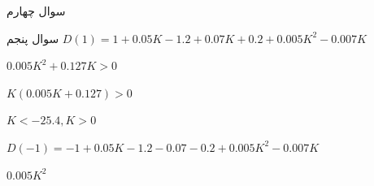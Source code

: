 \documentclass[12pt]{article}
\begin{document}
    \begin{problem}{سوال چهارم}

    	
    	

    	
    \end{problem}
    
    \begin{problem}{سوال پنجم}
    	\raggedleft
    	$D(1) = 1 + 0.05K - 1.2 + 0.07K + 0.2 + 0.005K^2 - 0.007K $
    	
    	$0.005K^2 + 0.127K > 0$
    	
    	$K(0.005K + 0.127) > 0$
    	
    	$K < -25.4 , K > 0$
    	
    	$D(-1) = -1 + 0.05K - 1.2 - 0.07 - 0.2 + 0.005K^2 - 0.007K$
    	
    	$0.005K^2 $
    
    \end{problem}
    
\end{document}
